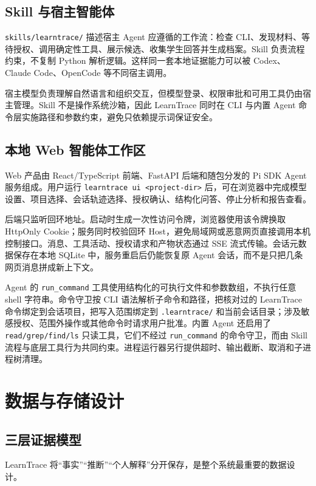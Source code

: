 \documentclass[UTF8,a4paper,12pt]{ctexart}
\begin{document}
\subsection{Skill 与宿主智能体}

\texttt{skills/learntrace/} 描述宿主 Agent 应遵循的工作流：检查 CLI、发现材料、等待授权、调用确定性工具、展示候选、收集学生回答并生成档案。Skill 负责流程约束，不复制 Python 解析逻辑。这样同一套本地证据能力可以被 Codex、Claude Code、OpenCode 等不同宿主调用。

宿主模型负责理解自然语言和组织交互，但模型登录、权限审批和可用工具仍由宿主管理。Skill 不是操作系统沙箱，因此 LearnTrace 同时在 CLI 与内置 Agent 命令层实施路径和参数约束，避免只依赖提示词保证安全。

\subsection{本地 Web 智能体工作区}

Web 产品由 React/TypeScript 前端、FastAPI 后端和随包分发的 Pi SDK Agent 服务组成。用户运行 \texttt{learntrace ui <project-dir>} 后，可在浏览器中完成模型设置、项目选择、会话轨迹选择、授权确认、结构化问答、停止分析和报告查看。

后端只监听回环地址。启动时生成一次性访问令牌，浏览器使用该令牌换取 HttpOnly Cookie；服务同时校验回环 Host，避免局域网或恶意网页直接调用本机控制接口。消息、工具活动、授权请求和产物状态通过 SSE 流式传输。会话元数据保存在本地 SQLite 中，服务重启后仍能恢复原 Agent 会话，而不是只把几条网页消息拼成新上下文。

Agent 的 \texttt{run\_command} 工具使用结构化的可执行文件和参数数组，不执行任意 shell 字符串。命令守卫按 CLI 语法解析子命令和路径，把核对过的 LearnTrace 命令绑定到会话项目，把写入范围绑定到 \texttt{.learntrace/} 和当前会话目录；涉及敏感授权、范围外操作或其他命令时请求用户批准。内置 Agent 还启用了 \texttt{read/grep/find/ls} 只读工具，它们不经过 \texttt{run\_command} 的命令守卫，而由 Skill 流程与底层工具行为共同约束。进程运行器另行提供超时、输出截断、取消和子进程树清理。

\section{数据与存储设计}

\subsection{三层证据模型}

LearnTrace 将“事实”“推断”“个人解释”分开保存，是整个系统最重要的数据设计。
\end{document}
